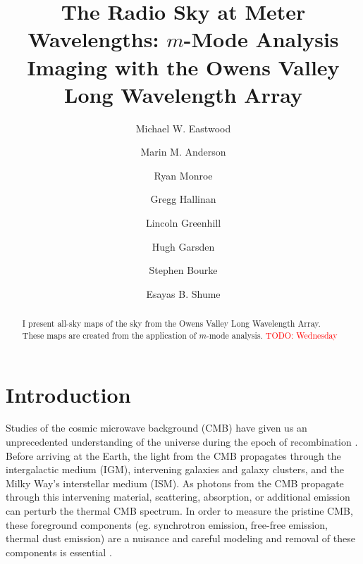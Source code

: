 \documentclass[twocolumn]{aastex61}
\newcommand{\todo}[1]{\textcolor{red}{TODO: #1}\PackageWarning{TODO:}{#1!}}
\begin{document}
\title{The Radio Sky at Meter Wavelengths: $m$-Mode Analysis Imaging with the Owens Valley Long Wavelength Array}

\author{Michael W. Eastwood}

\author{Marin M. Anderson}

\author{Ryan Monroe}

\author{Gregg Hallinan}

\author{Lincoln Greenhill}

\author{Hugh Garsden}

\author{Stephen Bourke}

\author{Esayas B. Shume} %


\begin{abstract}
    I present all-sky maps of the sky from the Owens Valley Long Wavelength Array.
    These maps are created from the application of $m$-mode analysis. \todo{Wednesday}
\end{abstract}


\section{Introduction}

Studies of the cosmic microwave background (CMB) have given us an unprecedented understanding of the
universe during the epoch of recombination \citep{2013ApJS..208...19H, 2014A&A...571A..16P,
2016A&A...594A..13P}. Before arriving at the Earth, the light from the CMB propagates through the
intergalactic medium (IGM), intervening galaxies and galaxy clusters, and the Milky Way's
interstellar medium (ISM). As photons from the CMB propagate through this intervening material,
scattering, absorption, or additional emission can perturb the thermal CMB spectrum. In order to
measure the pristine CMB, these foreground components (eg. synchrotron emission, free-free emission,
thermal dust emission) are a nuisance and careful modeling and removal of these components is
essential \citep{2016A&A...594A..10P, 2016A&A...594A..25P}.
\end{document}
